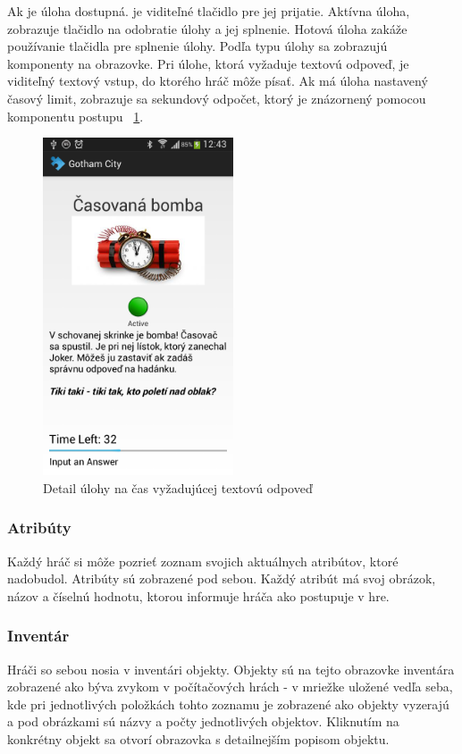 Ak je úloha dostupná. je viditeľné tlačidlo pre jej prijatie. 
Aktívna úloha, zobrazuje tlačidlo na odobratie úlohy a jej splnenie. Hotová úloha zakáže používanie tlačidla pre splnenie úlohy. Podľa typu úlohy sa zobrazujú komponenty na obrazovke. Pri úlohe, ktorá vyžaduje textovú odpoveď, je viditeľný textový vstup, do ktorého hráč môže písať. Ak má úloha nastavený časový limit, zobrazuje sa sekundový odpočet, ktorý je znázornený pomocou komponentu postupu ~\ref{fig:klient_deatilUlohy}.
\begin{figure}[h]
  \centering
  \includegraphics[height=10cm]{mainmatter/imgs/klient_questrunning.png}
  \caption{Detail úlohy na čas vyžadujúcej textovú odpoveď}
  \label{fig:klient_deatilUlohy}
\end{figure}

\subsubsection{Atribúty}
Každý hráč si môže pozrieť zoznam svojich aktuálnych atribútov, ktoré nadobudol. Atribúty sú zobrazené pod sebou. Každý atribút má svoj obrázok, názov a číselnú hodnotu, ktorou informuje hráča ako postupuje v hre.

\subsubsection{Inventár}
Hráči so sebou nosia v inventári objekty. Objekty sú na tejto obrazovke inventára zobrazené ako býva zvykom v počítačových hrách - v mriežke uložené vedľa seba, kde pri jednotlivých položkách tohto zoznamu je zobrazené ako objekty vyzerajú a pod obrázkami sú názvy a počty jednotlivých objektov. Kliknutím na konkrétny objekt sa otvorí obrazovka s detailnejším popisom objektu.

